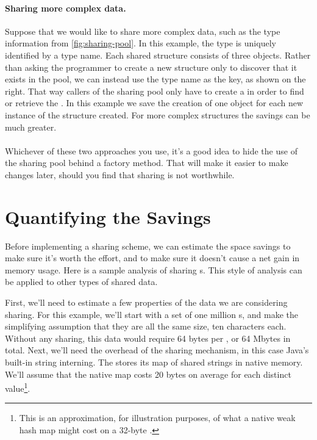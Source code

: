 \paragraph{Sharing more complex data.} Suppose that we would like to
share more complex data, such as the type information from \autoref{fig:sharing-pool}. In this example, the type is
uniquely identified by a  type name. Each shared structure
consists of three objects. Rather than asking the programmer to create a new  structure only to discover
that it exists in the pool, we can instead use the type name as the key, as
shown on the right. That way callers of the sharing pool only have to create a
 in order to find or retrieve the . In this example we save the creation of
one object for each new instance of the structure created.  For more complex
structures the savings can be much greater.

\paragraph{} Whichever of these two approaches you use, it's a good idea to hide
the use of the sharing pool behind a factory method. That will make it easier to make
changes later, should you find that sharing is not worthwhile.



\section{Quantifying the Savings}
\label{sec:quantifying-sharing-savings}

Before implementing a sharing scheme, we can estimate the
space savings to make sure it's worth
the effort, and to make sure it doesn't cause a net gain in
memory usage. Here is a sample analysis of sharing s.
This style of analysis can be applied to other types of shared data.

First, we'll need to estimate
a few properties of the data we are considering sharing. For this example,
we'll start with a set of one million s, and make the
simplifying assumption that they are all the same size, ten characters each.
Without any sharing, this data would require 64 bytes per ,
or 64 Mbytes in total. Next, we'll need the overhead
of the sharing mechanism, in this case Java's built-in string interning. The
\jre stores its map of shared strings in native memory. We'll assume that the
native map costs 20 bytes on average for each distinct value\footnote{This is
an approximation, for illustration purposes, of what
a native weak hash map might cost on a 32-byte \jre.}. 

